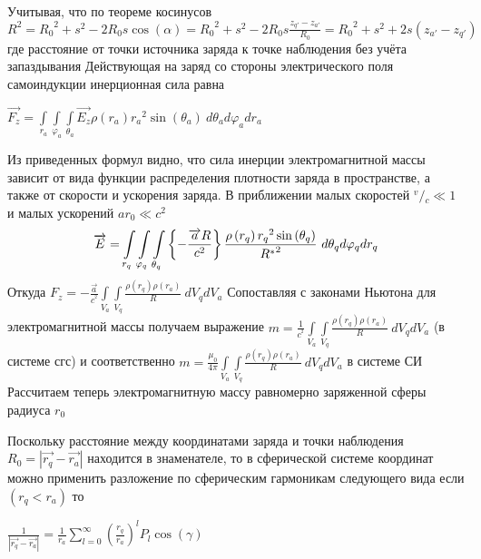 \documentclass{article}
\begin{document}
Учитывая, что по теореме косинусов
${{R}^{2}}={{R}_{0}}^{2}+{{s}^{2}}-2{{R}_{0}}s\cos \left( \alpha  \right)={{R}_{0}}^{2}+{{s}^{2}}-2{{R}_{0}}s\frac{{{z}_{q'}}-{{z}_{a'}}}{{{R}_{0}}}={{R}_{0}}^{2}+{{s}^{2}}+2s\left( {{z}_{a'}}-{{z}_{q'}} \right)$
где  расстояние от точки источника заряда к точке наблюдения без учёта запаздывания
Действующая на заряд со стороны электрического поля самоиндукции инерционная сила равна

$\overrightarrow{{{F}_{z}}}=\int\limits_{{{r}_{a}}}\int\limits_{{{\varphi}_{a}}}\int\limits_{{{\theta}_{a}}}{\overrightarrow{{{E}_{z}}}\rho \left( {{r}_{a}} \right){{r}_{a}}^{2}\sin \left( {{\theta }_{a}} \right)}\ d{{\theta }_{a}}d{{\varphi }_{a}}d{{r}_{a}}$


Из приведенных формул видно, что сила инерции электромагнитной массы зависит от вида функции распределения плотности заряда в пространстве, а также от скорости и ускорения заряда.
В приближении малых скоростей ${}^{v}/{}_{c}\ll 1$  и малых ускорений $a{{r}_{0}}\ll {{c}^{2}}$
\[\overrightarrow{E}=\int\limits_{{{r}_{q}}}\int\limits_{{{\varphi}_{q}}}\int\limits_{{{\theta}_{q}}}\\
{\left\{ -\frac{\overrightarrow{a}R}{{{c}^{2}}} \right\}\frac{\rho \left( {{r}_{q}} \right){{r}_{q}}^{2}\sin \left( {{\theta }_{q}} \right)}{{{R}^{*}}^{2}}\ }d{{\theta }_{q}}d{{\varphi }_{q}}d{{r}_{q}}\]
Откуда
${{F}_{z}}=-\frac{\overrightarrow{a}}{{{c}^{^{2}}}}\int\limits_{{{V}_{a}}}{\int\limits_{{{V}_{q}}}{\frac{\rho \left( {{r}_{q}} \right)\rho \left( {{r}_{a}} \right)}{R}}}\ d{{V}_{q}}d{{V}_{a}}$
Сопоставляя с законами Ньютона для электромагнитной массы получаем выражение
$m=\frac{1}{{{c}^{^{2}}}}\int\limits_{{{V}_{a}}}{\int\limits_{{{V}_{q}}}{\frac{\rho \left( {{r}_{q}} \right)\rho \left( {{r}_{a}} \right)}{R}}}\ d{{V}_{q}}d{{V}_{a}}$ (в системе сгс) и соответственно $m=\frac{{{\mu }_{0}}}{4\pi }\int\limits_{{{V}_{a}}}{\int\limits_{{{V}_{q}}}{\frac{\rho \left( {{r}_{q}} \right)\rho \left( {{r}_{a}} \right)}{R}}}\ d{{V}_{q}}d{{V}_{a}}$ в системе СИ
Рассчитаем теперь электромагнитную массу равномерно заряженной сферы радиуса ${{r}_{0}}$

Поскольку расстояние между координатами заряда и точки наблюдения ${{R}_{0}}=\left|\overrightarrow{r_{q}} - \overrightarrow{r_{a}}\right|$ находится в знаменателе, то в сферической системе координат можно применить разложение по сферическим гармоникам следующего вида  \cite{flugge} если $\left( {{r}_{q}}<{{r}_{a}} \right)$ то

$\frac{1}{\left| \overrightarrow{{{r}_{q}}}-\overrightarrow{{{r}_{a}}} \right|}=\frac{1}{{{r}_{a}}}\sum\limits_{l=0}^{\infty }{{{\left( \frac{{{r}_{q}}}{{{r}_{a}}} \right)}^{l}}{{P}_{l}} \cos \left( \gamma  \right)}$
\end{document}
